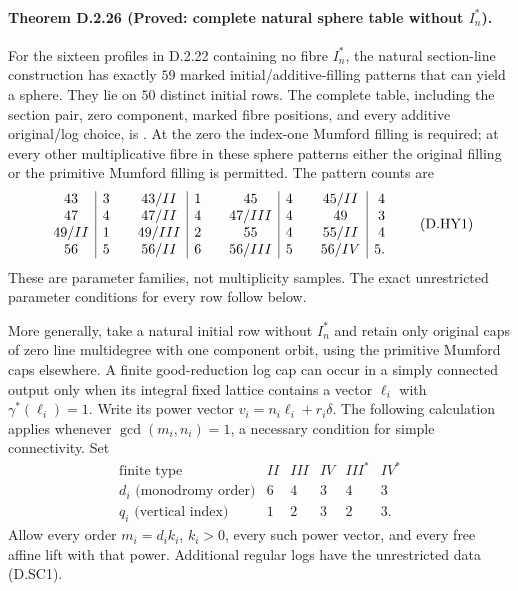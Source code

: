 \paragraph{Theorem D.2.26 (Proved: complete natural sphere table without $I_n^*$).}
For the sixteen profiles in D.2.22 containing no fibre $I_n^*$,
the natural section-line construction has exactly $59$ marked
initial/additive-filling patterns that can yield a sphere.
They lie on $50$ distinct initial rows. The complete table,
including the section pair, zero component, marked fibre positions,
and every additive original/log choice, is
.
At the zero the index-one Mumford filling is required; at every
other multiplicative fibre in these sphere patterns either the
original filling or the primitive Mumford filling is permitted.
The pattern counts are
\[
\begin{array}{c|r@{\qquad}c|r@{\qquad}c|r@{\qquad}c|r}
43&3&43/II&1&45&4&45/II&4\\
47&4&47/II&4&47/III&4&49&3\\
49/II&1&49/III&2&55&4&55/II&4\\
56&5&56/II&6&56/III&5&56/IV&5.
\end{array}                                                 \tag{D.HY1}
\]
These are parameter families, not multiplicity samples. The exact
unrestricted parameter conditions for every row follow below.

More generally, take a natural initial row without $I_n^*$ and
retain only original caps of zero line multidegree with one
component orbit, using the primitive Mumford caps elsewhere.
A finite good-reduction log cap can occur in a simply connected
output only when its integral fixed lattice contains a vector
$\ell_i$ with $\gamma^*(\ell_i)=1$. Write its power vector
$v_i=n_i\ell_i+r_i\delta$. The following calculation applies
whenever $\gcd(m_i,n_i)=1$, a necessary condition for simple
connectivity. Set
\[
\begin{array}{c|ccccc}
 \text{finite type}&II&III&IV&III^*&IV^*\\\hline
 d_i\text{ (monodromy order)}&6&4&3&4&3\\
 q_i\text{ (vertical index)}&1&2&3&2&3.
\end{array}                                                 \tag{D.HY2}
\]
Allow every order $m_i=d_i k_i$, $k_i>0$, every such power vector,
and every free affine lift with that power. Additional regular logs
have the unrestricted data (D.SC1).

